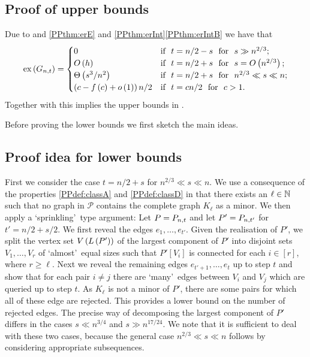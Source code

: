\subsection{Proof of upper bounds}\label{PPsubsec:proofUpper}
Due to \cite{Britikov1989,JansonKnuthLuczakPittel1993} and \ref{PPthm:erE} and \ref{PPthm:erInt}\ref{PPthm:erIntB} we have that \whp
\begin{align*}
	\operatorname{ex}\left(G_{n,t}\right)=
	\begin{cases}
		0 & \text{if} ~~ t=n/2-s ~~\text{for}~~ s\gg n^{2/3};
		\\
		O\left(h\right)& \text{if} ~~ t=n/2+s ~~\text{for}~~ s=O\left(n^{2/3}\right);
		\\
		\Theta\left(s^3/n^2\right)& \text{if} ~~ t=n/2+s ~~\text{for}~~ n^{2/3}\ll s\ll n;
		\\
		\left(c-f\left(c\right)+o\left(1\right)\right)n/2& \text{if} ~~ t=cn/2 ~~\text{for}~~ c>1.
	\end{cases}
\end{align*}
Together with  this implies the upper bounds in . 

Before proving the lower bounds we first sketch the main ideas.

\subsection{Proof idea for lower bounds}\label{PPsubsec:proofidea}
First we consider the case $t=n/2+s$ for $n^{2/3}\ll s\ll n$. We use a consequence of the properties \ref{PPdef:classA} and \ref{PPdef:classD} in  that there exists an $\ell\in\mathbb{N}$ such that no graph in $\mathcal{P}$ contains the complete graph $K_\ell$ as a minor. We then apply a \lq sprinkling\rq\ type argument: Let $P=P_{n,t}$ and let $P'=P_{n,t'}$ for $t'=n/2+s/2$. We first reveal the edges $e_1, \ldots, e_{t'}$. Given the realisation of $P'$, we split the vertex set $V\left(L\left(P'\right)\right)$ of the largest component of $P'$ into disjoint sets $V_1, \ldots, V_r$ of \lq almost\rq\ equal sizes such that $P'\left[V_i\right]$ is connected for each $i\in[r]$, where $r\geq \ell$. Next we reveal the remaining edges $e_{t'+1}, \ldots, e_t$ up to step $t$ and show that for each pair $i\neq j$ there are \lq many\rq\ edges between $V_i$ and $V_j$ which are queried up to step $t$. As $K_\ell$ is not a minor of $P'$, there are some pairs for which all of these edge are rejected. This provides a lower bound on the number of rejected edges. The precise way of decomposing the largest component of $P'$ differs in the cases $s\ll n^{3/4}$ and $s\gg n^{17/24}$. We note that it is sufficient to deal with these two cases, because the general case $n^{2/3}\ll s\ll n$ follows by considering appropriate subsequences.

